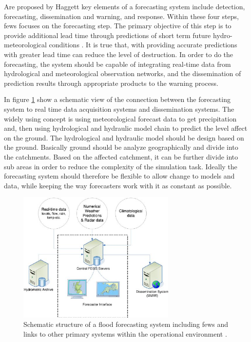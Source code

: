 Are proposed by Haggett \cite{Haggett1998AnWales} key elements of a forecasting system include detection, forecasting, dissemination and warning, and response. Within these four steps, \acrshort{fews} focuses on the forecasting step. The primary objective of this step is to provide additional lead time through predictions of short term future hydro-meteorological conditions \cite{Werner2005FloodCatchments}. It is true that, with providing accurate predictions with greater lead time can reduce the level of destruction. In order to do the forecasting, the system should be capable of integrating real-time data from hydrological and meteorological observation networks, and the dissemination of prediction results through appropriate products to the warning process.

In figure \ref{fi:fews_schematic} show a schematic view of the connection between the forecasting system to real time data acquisition systems and dissemination systems. The widely using concept is using meteorological forecast data to get precipitation and, then using hydrological and hydraulic model chain to predict the level affect on the ground. The hydrological and hydraulic model should be design based on the ground. Basically ground should be analyze geographically and divide into the catchments. Based on the affected catchment, it can be further divide into sub areas in order to reduce the complexity of the simulation task. Ideally the forecasting system should therefore be flexible to allow change to models and data, while keeping the way forecasters work with it as constant as possible.

\begin{figure}[htp]
    \centering
    \includegraphics[width=0.7\textwidth]{lit/fews/Schematic-structure-of-a-fl-ood-forecasting-system-showing-the-position-of-Delft-FEWS_W640.jpg}
    \caption[Schematic structure of a flood forecasting system including \acrshort{fews} and links to other primary systems within the operational environment]{Schematic structure of a flood forecasting system including \acrshort{fews} and links to other primary systems within the operational environment \cite{Werner2013TheSystem}.}
    \label{fi:fews_schematic}
\end{figure}

